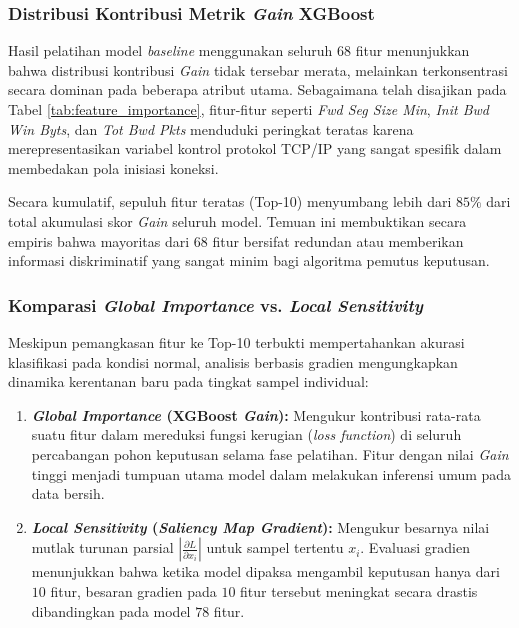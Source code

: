 \documentclass[11pt, a4paper]{article}
\begin{document}
\subsubsection{Distribusi Kontribusi Metrik \textit{Gain} XGBoost}
Hasil pelatihan model \textit{baseline} menggunakan seluruh $68$ fitur menunjukkan bahwa distribusi kontribusi \textit{Gain} tidak tersebar merata, melainkan terkonsentrasi secara dominan pada beberapa atribut utama. Sebagaimana telah disajikan pada Tabel \ref{tab:feature_importance}, fitur-fitur seperti \textit{Fwd Seg Size Min}, \textit{Init Bwd Win Byts}, dan \textit{Tot Bwd Pkts} menduduki peringkat teratas karena merepresentasikan variabel kontrol protokol TCP/IP yang sangat spesifik dalam membedakan pola inisiasi koneksi.

Secara kumulatif, sepuluh fitur teratas (Top-10) menyumbang lebih dari $85\%$ dari total akumulasi skor \textit{Gain} seluruh model. Temuan ini membuktikan secara empiris bahwa mayoritas dari $68$ fitur bersifat redundan atau memberikan informasi diskriminatif yang sangat minim bagi algoritma pemutus keputusan.

\subsubsection{Komparasi \textit{Global Importance} vs. \textit{Local Sensitivity}}
Meskipun pemangkasan fitur ke Top-10 terbukti mempertahankan akurasi klasifikasi pada kondisi normal, analisis berbasis gradien mengungkapkan dinamika kerentanan baru pada tingkat sampel individual:
\begin{enumerate}
    \item \textbf{\textit{Global Importance} (XGBoost \textit{Gain}):} Mengukur kontribusi rata-rata suatu fitur dalam mereduksi fungsi kerugian (\textit{loss function}) di seluruh percabangan pohon keputusan selama fase pelatihan. Fitur dengan nilai \textit{Gain} tinggi menjadi tumpuan utama model dalam melakukan inferensi umum pada data bersih.
    
    \item \textbf{\textit{Local Sensitivity} (\textit{Saliency Map Gradient}):} Mengukur besarnya nilai mutlak turunan parsial $\left| \frac{\partial L}{\partial x_i} \right|$ untuk sampel tertentu $x_i$. Evaluasi gradien menunjukkan bahwa ketika model dipaksa mengambil keputusan hanya dari $10$ fitur, besaran gradien pada $10$ fitur tersebut meningkat secara drastis dibandingkan pada model $78$ fitur.
\end{enumerate}
\end{document}
